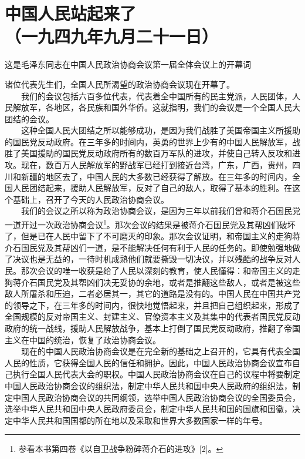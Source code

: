 \documentclass[cn,11pt,chinese]{elegantbook}
\def\myformat#1{\hfil\hfil #1}
\begin{document}
\section*{\myformat{中国人民站起来了}\\\myformat{（一九四九年九月二十一日）}}
\begin{introduction}\item  这是毛泽东同志在中国人民政治协商会议第一届全体会议上的开幕词\end{introduction}
诸位代表先生们，全国人民所渴望的政治协商会议现在开幕了。\\
　　我们的会议包括六百多位代表，代表着全中国所有的民主党派，人民团体，人民解放军，各地区，各民族和国外华侨。这就指明，我们的会议是一个全国人民大团结的会议。\\
　　这种全国人民大团结之所以能够成功，是因为我们战胜了美国帝国主义所援助的国民党反动政府。在三年多的时间内，英勇的世界上少有的中国人民解放军，战胜了美国援助的国民党反动政府所有的数百万军队的进攻，并使自己转入反攻和进攻。现在，数百万人民解放军的野战军已经打到接近台湾，广东，广西，贵州，四川和新疆的地区去了，中国人民的大多数已经获得了解放。在三年多的时间内，全国人民团结起来，援助人民解放军，反对了自己的敌人，取得了基本的胜利。在这个基础上，召开了今天的人民政治协商会议。\\
　　我们的会议之所以称为政治协商会议，是因为三年以前我们曾和蒋介石国民党一道开过一次政治协商会议\footnote[1]{ 参看本书第四卷《以自卫战争粉碎蒋介石的进攻》[2]。}。那次会议的结果是被蒋介石国民党及其帮凶们破坏了，但是已在人民中留下了不可磨灭的印象。那次会议证明，和帝国主义的走狗蒋介石国民党及其帮凶们一道，是不能解决任何有利于人民的任务的。即使勉强地做了决议也是无益的，一待时机成熟他们就要撕毁一切决议，并以残酷的战争反对人民。那次会议的唯一收获是给了人民以深刻的教育，使人民懂得：和帝国主义的走狗蒋介石国民党及其帮凶们决无妥协的余地，或者是推翻这些敌人，或者是被这些敌人所屠杀和压迫，二者必居其一，其它的道路是没有的。中国人民在中国共产党的领导之下，在三年多的时间内，很快地觉悟起来，并且把自己组织起来，形成了全国规模的反对帝国主义、封建主义、官僚资本主义及其集中的代表者国民党反动政府的统一战线，援助人民解放战争，基本上打倒了国民党反动政府，推翻了帝国主义在中国的统治，恢复了政治协商会议。\\
　　现在的中国人民政治协商会议是在完全新的基础之上召开的，它具有代表全国人民的性质，它获得全国人民的信任和拥护。因此，中国人民政治协商会议宣布自己执行全国人民代表大会的职权。中国人民政治协商会议在自己的议程中将要制定中国人民政治协商会议的组织法，制定中华人民共和国中央人民政府的组织法，制定中国人民政治协商会议的共同纲领，选举中国人民政治协商会议的全国委员会，选举中华人民共和国中央人民政府委员会，制定中华人民共和国的国旗和国徽，决定中华人民共和国国都的所在地以及采取和世界大多数国家一样的年号。\\
\end{document}
